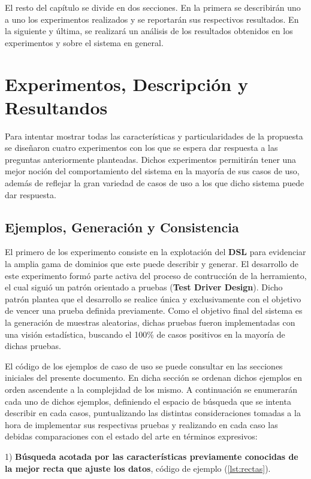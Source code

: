 El resto del capítulo se divide en dos secciones. En la primera se describirán uno a uno los
experimentos realizados y se reportarán sus respectivos resultados. En la siguiente y última,
se realizará un análisis de los resultados obtenidos en los experimentos
y sobre el sistema en general.

\section{Experimentos, Descripción y Resultandos}

Para intentar mostrar todas las características y particularidades de la propuesta se diseñaron
cuatro experimentos con los que se espera dar respuesta a las preguntas anteriormente planteadas. 
Dichos experimentos permitirán tener una mejor noción del
comportamiento del sistema en la mayoría de sus casos de uso, además de reflejar la gran variedad de
casos de uso a los que dicho sistema puede dar respuesta.

\subsection{Ejemplos, Generación y Consistencia}

El primero de los experimento consiste en la explotación del {\bf DSL} para evidenciar la
amplia gama de dominios que este puede describir y generar. El desarrollo de este experimento
formó parte activa del proceso de contrucción de la herramiento, el cual siguió un patrón orientado a pruebas ({\bf Test
            Driver Design}). Dicho patrón plantea que el desarrollo se realice única y exclusivamente con el
objetivo de vencer una prueba definida previamente. Como el objetivo final del sistema es la
generación de muestras aleatorias, dichas pruebas fueron implementadas con una visión estadística,
buscando el 100\% de casos positivos en la mayoría de dichas pruebas.

El código de los ejemplos de caso de uso se puede consultar en las secciones iniciales del presente
documento. En dicha sección se ordenan dichos ejemplos en orden ascendente a la complejidad de los
mismo. A continuación se enumerarán cada uno de dichos ejemplos, definiendo el espacio de búsqueda
que se intenta describir en cada casos, puntualizando las distintas consideraciones tomadas a la hora
de implementar sus respectivas pruebas y realizando en cada caso las debidas comparaciones con el
estado del arte en términos expresivos:

1) {\bf Búsqueda acotada por las características previamente conocidas de la mejor recta que ajuste los
            datos}, código de ejemplo (\ref{lst:rectas}). 

